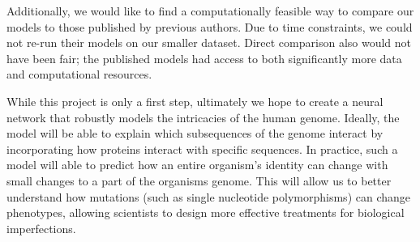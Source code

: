 \documentclass{article} %
\begin{document}
Additionally, we would like to find a computationally feasible way to compare our models to those published by previous authors. Due to time constraints, we could not re-run their models on our smaller dataset. Direct comparison also would not have been fair; the published models had access to both significantly more data and computational resources.

While this project is only a first step, ultimately we hope to create a neural network that robustly models the intricacies of the human genome. Ideally, the model will be able to explain which subsequences of the genome interact by incorporating how proteins interact with specific sequences. In practice, such a model will able to predict how an entire organism's identity can change with small changes to a part of the organisms genome. This will allow us to better understand how mutations (such as single nucleotide polymorphisms) can change phenotypes, allowing scientists to design more effective treatments for biological imperfections.
 


\end{document}
